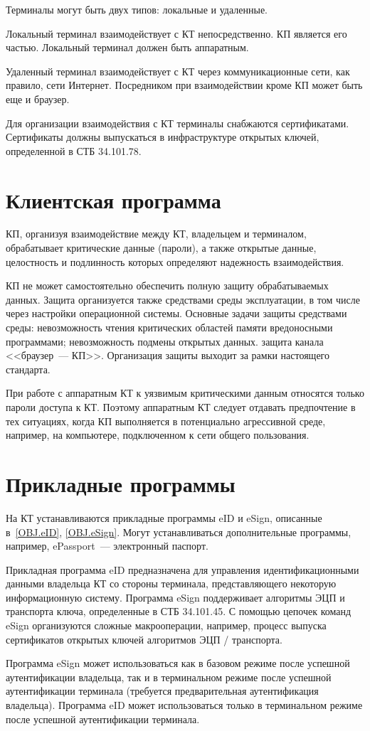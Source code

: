 Терминалы могут быть двух типов: локальные и удаленные.

Локальный терминал взаимодействует с КТ непосредственно. КП является 
его частью. Локальный терминал должен быть аппаратным.

Удаленный терминал взаимодействует с КТ через коммуникационные сети,
как правило, сети Интернет. Посредником при взаимодействии 
кроме КП может быть еще и браузер. 

Для организации взаимодействия с КТ терминалы снабжаются сертификатами.
Сертификаты должны выпускаться в инфраструктуре открытых ключей, 
определенной в СТБ 34.101.78.

\section{Клиентская программа}

КП, организуя взаимодействие между КТ, владельцем и терминалом,
обрабатывает критические данные (пароли), а также открытые данные, 
целостность и подлинность которых определяют надежность  
взаимодействия.

КП не может самостоятельно 
обеспечить полную защиту обрабатываемых данных. 
Защита организуется также средствами среды эксплуатации, 
в том числе через настройки операционной системы.  
%
Основные задачи защиты средствами среды: 
невозможность чтения критических областей памяти вредоносными программами; 
невозможность подмены открытых данных.
защита канала <<браузер~--- КП>>.
%
Организация защиты выходит за рамки настоящего стандарта.

При работе с аппаратным КТ к уязвимым критическими данным
относятся только пароли доступа к КТ. Поэтому аппаратным КТ следует отдавать 
предпочтение в тех ситуациях, когда КП выполняется в потенциально агрессивной 
среде, например, на компьютере, подключенном к сети общего пользования.

\section{Прикладные программы} 

На КТ устанавливаются прикладные программы eID и eSign,
описанные в~\ref{OBJ.eID}, \ref{OBJ.eSign}. Могут устанавливаться 
дополнительные программы, например, ePassport~--- электронный 
паспорт.

Прикладная программа eID предназначена для управления идентификационными
данными владельца КТ со стороны терминала, представляющего некоторую 
информационную систему. 
%
Программа eSign поддерживает алгоритмы ЭЦП и транспорта ключа,
определенные в СТБ 34.101.45. С помощью цепочек команд eSign
организуются сложные макрооперации, например, процесс выпуска сертификатов 
открытых ключей алгоритмов ЭЦП / транспорта.

Программа eSign может использоваться как в базовом режиме 
после успешной аутентификации владельца, так и в терминальном режиме 
после успешной аутентификации терминала (требуется предварительная 
аутентификация владельца). 
%
Программа eID может использоваться только в терминальном режиме
после успешной аутентификации терминала. 




